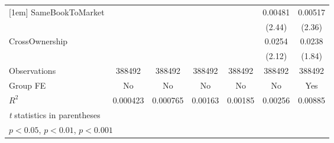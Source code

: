 {\begin{tabular}{l*{6}{c}}
[1em]
SameBookToMarket&                  &                  &                  &                  &  0.00481\sym{*}  &  0.00517\sym{*}  \\
                &                  &                  &                  &                  &   (2.44)         &   (2.36)         \\
[1em]
CrossOwnership  &                  &                  &                  &                  &   0.0254\sym{*}  &   0.0238         \\
                &                  &                  &                  &                  &   (2.12)         &   (1.84)         \\
\hline
Observations    &   388492         &   388492         &   388492         &   388492         &   388492         &   388492         \\
Group FE        &       No         &       No         &       No         &       No         &       No         &      Yes         \\
$ R^2 $         & 0.000423         & 0.000765         &  0.00163         &  0.00185         &  0.00256         &  0.00885         \\
\hline\hline
\multicolumn{7}{l}{\footnotesize \textit{t} statistics in parentheses}\\
\multicolumn{7}{l}{\footnotesize \sym{*} \(p<0.05\), \sym{**} \(p<0.01\), \sym{***} \(p<0.001\)}\\
\end{tabular}
}
